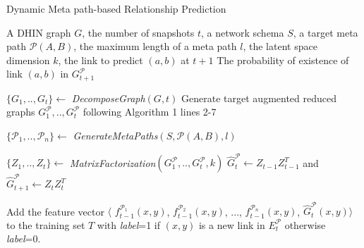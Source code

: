 \begin{algorithm}[t]
\caption{Dynamic Meta path-based Relationship Prediction}\label{alg2}
\begin{algorithmic}[1]%
\REQUIRE A DHIN graph $G$, the number of snapshots $t$, a network schema $S$, a target meta path $\mathcal{P}(A,B)$, the maximum length of a meta path $l$, the latent space dimension $k$, the link to predict $(a,b)$ at $t+1$
\ENSURE The probability of existence of link $(a,b)$ in $G^\mathcal{P}_{t+1}$

\STATE $\{G_1, .., G_t\} \leftarrow$ \textit{DecomposeGraph}$(G, t)$
\STATE  Generate target augmented reduced graphs $G^\mathcal{P}_1, .., G^\mathcal{P}_t$ following Algorithm 1 lines 2-7

\STATE $\{\mathcal{P}_1, .., \mathcal{P}_n\} \leftarrow$ \textit{GenerateMetaPaths}$(S, \mathcal{P}(A,B), l)$

%
%



\STATE $\{Z_1, .., Z_t\} \leftarrow$ \textit{MatrixFactorization}$(G^\mathcal{P}_1, .., G^\mathcal{P}_t, k)$
\STATE $\hat{G}^\mathcal{P}_{t} \leftarrow Z_{t-1}Z^T_{t-1}$ and  $\hat{G}^\mathcal{P}_{t+1} \leftarrow Z_tZ^T_t$



\STATE Add the feature vector $\langle$ $f^{\mathcal{P}_1}_{t-1}(x,y)$, $f^{\mathcal{P}_2}_{t-1}(x,y)$, ..., $f^{\mathcal{P}_n}_{t-1}(x,y)$, $\hat{G}^\mathcal{P}_{t}(x,y)\rangle$ to the training set $T$ with \textit{label}=1 if $(x,y)$ is a new link in $E^\mathcal{P}_{t}$ otherwise \textit{label}=0.


\end{algorithmic}
\end{algorithm}
